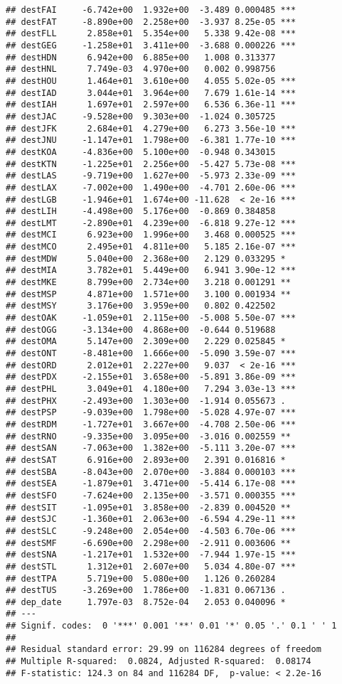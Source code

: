 \documentclass[
]{article}
\begin{document}
\begin{verbatim}
## destFAI     -6.742e+00  1.932e+00  -3.489 0.000485 ***
## destFAT     -8.890e+00  2.258e+00  -3.937 8.25e-05 ***
## destFLL      2.858e+01  5.354e+00   5.338 9.42e-08 ***
## destGEG     -1.258e+01  3.411e+00  -3.688 0.000226 ***
## destHDN      6.942e+00  6.885e+00   1.008 0.313377    
## destHNL      7.749e-03  4.970e+00   0.002 0.998756    
## destHOU      1.464e+01  3.610e+00   4.055 5.02e-05 ***
## destIAD      3.044e+01  3.964e+00   7.679 1.61e-14 ***
## destIAH      1.697e+01  2.597e+00   6.536 6.36e-11 ***
## destJAC     -9.528e+00  9.303e+00  -1.024 0.305725    
## destJFK      2.684e+01  4.279e+00   6.273 3.56e-10 ***
## destJNU     -1.147e+01  1.798e+00  -6.381 1.77e-10 ***
## destKOA     -4.836e+00  5.100e+00  -0.948 0.343015    
## destKTN     -1.225e+01  2.256e+00  -5.427 5.73e-08 ***
## destLAS     -9.719e+00  1.627e+00  -5.973 2.33e-09 ***
## destLAX     -7.002e+00  1.490e+00  -4.701 2.60e-06 ***
## destLGB     -1.946e+01  1.674e+00 -11.628  < 2e-16 ***
## destLIH     -4.498e+00  5.176e+00  -0.869 0.384858    
## destLMT     -2.890e+01  4.239e+00  -6.818 9.27e-12 ***
## destMCI      6.923e+00  1.996e+00   3.468 0.000525 ***
## destMCO      2.495e+01  4.811e+00   5.185 2.16e-07 ***
## destMDW      5.040e+00  2.368e+00   2.129 0.033295 *  
## destMIA      3.782e+01  5.449e+00   6.941 3.90e-12 ***
## destMKE      8.799e+00  2.734e+00   3.218 0.001291 ** 
## destMSP      4.871e+00  1.571e+00   3.100 0.001934 ** 
## destMSY      3.176e+00  3.959e+00   0.802 0.422502    
## destOAK     -1.059e+01  2.115e+00  -5.008 5.50e-07 ***
## destOGG     -3.134e+00  4.868e+00  -0.644 0.519688    
## destOMA      5.147e+00  2.309e+00   2.229 0.025845 *  
## destONT     -8.481e+00  1.666e+00  -5.090 3.59e-07 ***
## destORD      2.012e+01  2.227e+00   9.037  < 2e-16 ***
## destPDX     -2.155e+01  3.658e+00  -5.891 3.86e-09 ***
## destPHL      3.049e+01  4.180e+00   7.294 3.03e-13 ***
## destPHX     -2.493e+00  1.303e+00  -1.914 0.055673 .  
## destPSP     -9.039e+00  1.798e+00  -5.028 4.97e-07 ***
## destRDM     -1.727e+01  3.667e+00  -4.708 2.50e-06 ***
## destRNO     -9.335e+00  3.095e+00  -3.016 0.002559 ** 
## destSAN     -7.063e+00  1.382e+00  -5.111 3.20e-07 ***
## destSAT      6.916e+00  2.893e+00   2.391 0.016816 *  
## destSBA     -8.043e+00  2.070e+00  -3.884 0.000103 ***
## destSEA     -1.879e+01  3.471e+00  -5.414 6.17e-08 ***
## destSFO     -7.624e+00  2.135e+00  -3.571 0.000355 ***
## destSIT     -1.095e+01  3.858e+00  -2.839 0.004520 ** 
## destSJC     -1.360e+01  2.063e+00  -6.594 4.29e-11 ***
## destSLC     -9.248e+00  2.054e+00  -4.503 6.70e-06 ***
## destSMF     -6.690e+00  2.298e+00  -2.911 0.003606 ** 
## destSNA     -1.217e+01  1.532e+00  -7.944 1.97e-15 ***
## destSTL      1.312e+01  2.607e+00   5.034 4.80e-07 ***
## destTPA      5.719e+00  5.080e+00   1.126 0.260284    
## destTUS     -3.269e+00  1.786e+00  -1.831 0.067136 .  
## dep_date     1.797e-03  8.752e-04   2.053 0.040096 *  
## ---
## Signif. codes:  0 '***' 0.001 '**' 0.01 '*' 0.05 '.' 0.1 ' ' 1
## 
## Residual standard error: 29.99 on 116284 degrees of freedom
## Multiple R-squared:  0.0824, Adjusted R-squared:  0.08174 
## F-statistic: 124.3 on 84 and 116284 DF,  p-value: < 2.2e-16
\end{verbatim}
\end{document}
